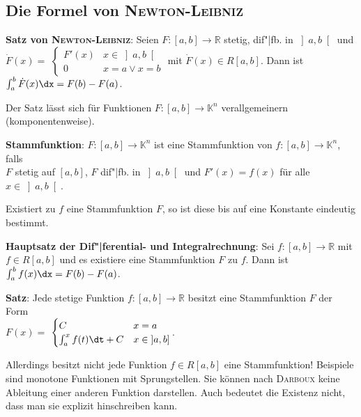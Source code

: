 \pagebreak

\subsection{%
    Die Formel von \textsc{Newton}-\textsc{Leibniz}%
}

\textbf{Satz von \textsc{Newton}-\textsc{Leibniz}}:
Seien $F: [a,b] \rightarrow \mathbb{R}$ stetig,
dif"|fb. in $\left]a,b\right[$ und \\
$\dot{F}(x) =$ {\footnotesize $\begin{cases}F'(x) & x \in \left]a,b\right[ \\
0 & x = a \lor x = b\end{cases}$} \;mit $\dot{F}(x) \in R[a,b]$. \qquad\qquad
Dann ist $\int_a^b \dot{F}(x)\dx = F(b) - F(a)$.

Der Satz lässt sich für Funktionen $F: [a,b] \rightarrow \mathbb{K}^n$
verallgemeinern (komponentenweise).

\textbf{Stammfunktion}:
$F: [a,b] \rightarrow \mathbb{K}^n$ ist eine Stammfunktion von
$f: [a,b] \rightarrow \mathbb{K}^n$, falls \\
$F$ stetig auf $[a,b]$, \qquad
$F$ dif"|fb. in $\left]a,b\right[$ \qquad und \qquad
$F'(x) = f(x)$ für alle $x \in \left]a,b\right[$.

Existiert zu $f$ eine Stammfunktion $F$, so ist diese bis auf eine Konstante
eindeutig bestimmt.

\textbf{Hauptsatz der Dif"|ferential- und Integralrechnung}:
Sei $f: [a,b] \rightarrow \mathbb{R}$ mit $f \in R[a,b]$ und es existiere
eine Stammfunktion $F$ zu $f$. \qquad\qquad
Dann ist $\int_a^b f(x)\dx = F(b) - F(a)$.

\linie

\textbf{Satz}:
Jede stetige Funktion $f: [a,b] \rightarrow \mathbb{R}$ besitzt eine
Stammfunktion $F$ der Form \\
$F(x) =$ {\footnotesize $\begin{cases}C & x = a \\
\int_a^x f(t)\dt + C & x \in \left]a,b\right]\end{cases}$}.

Allerdings besitzt nicht jede Funktion $f \in R[a,b]$ eine Stammfunktion!
Beispiele sind monotone Funktionen mit Sprungstellen.
Sie können nach \textsc{Darboux} keine Ableitung einer anderen
Funktion darstellen.
Auch bedeutet die Existenz nicht, dass man sie
explizit hinschreiben kann.

\linie

